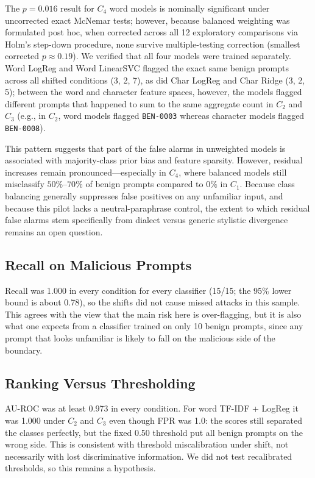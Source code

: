 \documentclass[conference]{IEEEtran}
\begin{document}
The $p = 0.016$ result for $C_4$ word models is nominally significant under uncorrected exact McNemar tests; however, because balanced weighting was formulated post hoc, when corrected across all 12 exploratory comparisons via Holm's step-down procedure, none survive multiple-testing correction (smallest corrected $p \approx 0.19$). We verified that all four models were trained separately. Word LogReg and Word LinearSVC flagged the exact same benign prompts across all shifted conditions (3, 2, 7), as did Char LogReg and Char Ridge (3, 2, 5); between the word and character feature spaces, however, the models flagged different prompts that happened to sum to the same aggregate count in $C_2$ and $C_3$ (e.g., in $C_2$, word models flagged \texttt{BEN-0003} whereas character models flagged \texttt{BEN-0008}).

This pattern suggests that part of the false alarms in unweighted models is associated with majority-class prior bias and feature sparsity. However, residual increases remain pronounced---especially in $C_4$, where balanced models still misclassify $50\%$--$70\%$ of benign prompts compared to $0\%$ in $C_1$. Because class balancing generally suppresses false positives on any unfamiliar input, and because this pilot lacks a neutral-paraphrase control, the extent to which residual false alarms stem specifically from dialect versus generic stylistic divergence remains an open question.

\subsection{Recall on Malicious Prompts}
Recall was 1.000 in every condition for every classifier (15/15; the 95\% lower bound is about 0.78), so the shifts did not cause missed attacks in this sample. This agrees with the view that the main risk here is over-flagging, but it is also what one expects from a classifier trained on only 10 benign prompts, since any prompt that looks unfamiliar is likely to fall on the malicious side of the boundary.

\subsection{Ranking Versus Thresholding}
AU-ROC was at least 0.973 in every condition. For word TF-IDF + LogReg it was 1.000 under $C_2$ and $C_3$ even though FPR was 1.0: the scores still separated the classes perfectly, but the fixed 0.50 threshold put all benign prompts on the wrong side. This is consistent with threshold miscalibration under shift, not necessarily with lost discriminative information. We did not test recalibrated thresholds, so this remains a hypothesis.
\end{document}
